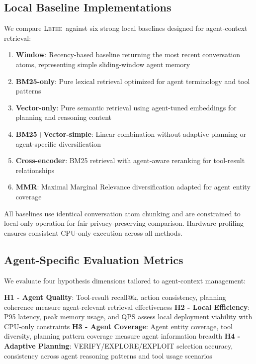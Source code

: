 \documentclass[letterpaper]{article}
\newcommand{\lethe}{\textsc{Lethe}}
\begin{document}
\subsection{Local Baseline Implementations}

We compare \lethe\ against six strong local baselines designed for agent-context retrieval:

\begin{enumerate}
    \item \textbf{Window}: Recency-based baseline returning the most recent conversation atoms, representing simple sliding-window agent memory
    \item \textbf{BM25-only}: Pure lexical retrieval optimized for agent terminology and tool patterns
    \item \textbf{Vector-only}: Pure semantic retrieval using agent-tuned embeddings for planning and reasoning content
    \item \textbf{BM25+Vector-simple}: Linear combination without adaptive planning or agent-specific diversification
    \item \textbf{Cross-encoder}: BM25 retrieval with agent-aware reranking for tool-result relationships
    \item \textbf{MMR}: Maximal Marginal Relevance diversification adapted for agent entity coverage
\end{enumerate}

All baselines use identical conversation atom chunking and are constrained to local-only operation for fair privacy-preserving comparison. Hardware profiling ensures consistent CPU-only execution across all methods.

\subsection{Agent-Specific Evaluation Metrics}

We evaluate four hypothesis dimensions tailored to agent-context management:

\textbf{H1 - Agent Quality}: Tool-result recall@k, action consistency, planning coherence measure agent-relevant retrieval effectiveness
\textbf{H2 - Local Efficiency}: P95 latency, peak memory usage, and QPS assess local deployment viability with CPU-only constraints
\textbf{H3 - Agent Coverage}: Agent entity coverage, tool diversity, planning pattern coverage measure agent information breadth
\textbf{H4 - Adaptive Planning}: VERIFY/EXPLORE/EXPLOIT selection accuracy, consistency across agent reasoning patterns and tool usage scenarios
\end{document}
